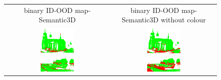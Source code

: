     \begin{figure}[h!]
        \centering
        \begin{tabular}{cc}
            binary ID-OOD map-Semantic3D & binary ID-OOD map-Semantic3D without colour \\
            \includegraphics[width=0.33\textwidth, height=0.18\textheight]{images/ood_imgs/sem3d_of/prob/de_sem3d_OOD_1.pdf}&
            \includegraphics[width=0.33\textwidth, height=0.18\textheight]{images/ood_imgs/sem3d_of/prob/de_sem3d_of_OOD_1.pdf}\\

            \includegraphics[width=0.33\textwidth, height=0.18\textheight]{images/ood_imgs/sem3d_of/prob/de_sem3d_OOD_2.pdf}&
            \includegraphics[width=0.33\textwidth, height=0.18\textheight]{images/ood_imgs/sem3d_of/prob/de_sem3d_of_OOD_2.pdf}\\


\end{tabular}
\end{figure}
